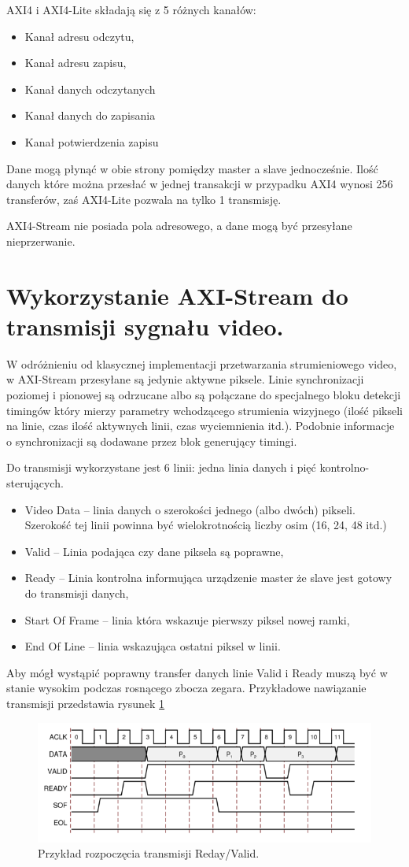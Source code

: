 AXI4 i AXI4-Lite składają się z 5 różnych kanałów:
\begin{itemize}
\item Kanał adresu odczytu,
\item Kanał adresu zapisu,
\item Kanał danych odczytanych
\item Kanał danych do zapisania
\item Kanał potwierdzenia zapisu
\end{itemize}
Dane mogą płynąć w obie strony pomiędzy master a slave jednocześnie. Ilość danych które można przesłać w jednej transakcji w przypadku AXI4 wynosi 256 transferów, zaś AXI4-Lite pozwala na tylko 1 transmisję.

AXI4-Stream nie posiada pola adresowego, a dane mogą być przesyłane nieprzerwanie. 
\section{Wykorzystanie AXI-Stream do transmisji sygnału video.} 
W odróżnieniu od klasycznej implementacji przetwarzania strumieniowego video, w AXI-Stream przesyłane są jedynie aktywne piksele. Linie synchronizacji poziomej i pionowej są odrzucane albo są połączane do specjalnego bloku detekcji timingów który mierzy parametry wchodzącego strumienia wizyjnego (ilość pikseli na linie, czas ilość aktywnych linii, czas wyciemnienia itd.). Podobnie informacje o synchronizacji są dodawane przez blok generujący timingi.

Do transmisji wykorzystane jest 6 linii: jedna linia danych i pięć kontrolno-sterujących. 
\begin{itemize}
\item Video Data – linia danych o szerokości jednego (albo dwóch) pikseli. Szerokość tej linii powinna być wielokrotnością liczby osim (16, 24, 48 itd.)
\item Valid – Linia podająca czy dane piksela są poprawne,
\item Ready – Linia kontrolna informująca urządzenie master że slave jest gotowy do transmisji danych,
\item Start Of Frame – linia która wskazuje pierwszy piksel nowej ramki,
\item End Of Line – linia wskazująca ostatni piksel w linii.
\end{itemize}
Aby mógł wystąpić poprawny transfer danych linie Valid i Ready muszą być w stanie wysokim podczas rosnącego zbocza zegara. Przykładowe nawiązanie transmisji przedstawia rysunek \ref{fig:handshake}

\begin{figure}[h]
    \centering
    \includegraphics[width=1\textwidth]{images/axi-stream_hendshake}
    \caption{Przykład rozpoczęcia transmisji Reday/Valid.}
    \label{fig:handshake}
\end{figure}
